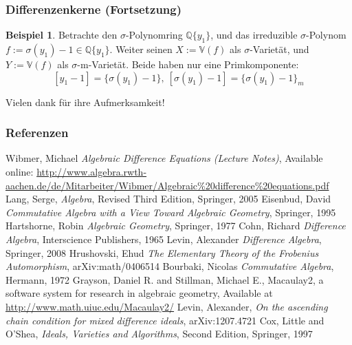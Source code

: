 \documentclass{beamer}
\def\Q{\mathbb{Q}}
\def\Q{\mathbb{Q}}
\def\VV{\mathbb{V}}
\def\s{\sigma}
\theoremstyle{definition}
\newtheorem{ex}[satz]{Beispiel}
\begin{document}
\begin{frame}\frametitle{Differenzenkerne (Fortsetzung)}
\begin{ex}
Betrachte den $\s$-Polynomring $\Q\{y_1\}$, und das irreduzible $\s$-Polynom $f := \s(y_1) - 1 \in \Q\{y_1\}$.  
Weiter seinen $X:= \VV(f)$ als $\s$-Varietät, und $Y:= \VV(f)$ als $\s$-m-Varietät. Beide haben nur eine Primkomponente:
$$[y_1 -1 ] = \{ \s(y_1) - 1 \},~ [\s(y_1) -1 ] = \{ \s(y_1) - 1 \}_m$$ 
\end{ex}
\end{frame}

\begin{frame}
\LARGE Vielen dank für ihre Aufmerksamkeit!
\end{frame}

\begin{frame}[allowframebreaks]\frametitle{Referenzen}
\begin{thebibliography}{9}
 Wibmer, Michael \emph{Algebraic Difference Equations (Lecture Notes)}, Available online: \url{http://www.algebra.rwth-aachen.de/de/Mitarbeiter/Wibmer/Algebraic\%20difference\%20equations.pdf}
 Lang, Serge, \emph{Algebra}, Revised Third Edition, Springer, 2005
 Eisenbud, David \emph{Commutative Algebra with a View Toward Algebraic Geometry}, Springer, 1995
 Hartshorne, Robin \emph{Algebraic Geometry}, Springer, 1977
 Cohn,  Richard \emph{Difference Algebra}, Interscience Publishers, 1965
 Levin, Alexander \emph{Difference Algebra}, Springer, 2008
 Hrushovski, Ehud \emph{The Elementary Theory of the Frobenius Automorphism}, arXiv:math/0406514 
 Bourbaki, Nicolas \emph{Commutative Algebra}, Hermann, 1972
 Grayson, Daniel R. and Stillman, Michael E., Macaulay2, a software system for research in algebraic geometry, Available at \href{http://www.math.uiuc.edu/Macaulay2/}{http://www.math.uiuc.edu/Macaulay2/}
 Levin, Alexander, \emph{On the ascending chain condition for mixed difference ideals}, 	arXiv:1207.4721
 Cox, Little and O'Shea, \emph{ Ideals, Varieties and Algorithms}, Second Edition, Springer, 1997
\end{thebibliography}
\end{frame}
\end{document}
